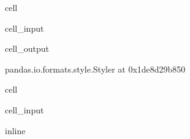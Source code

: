 \documentclass[letterpaper,10pt,english]{jupyterBook}
\begin{document}
\begin{sphinxuseclass}{cell}\begin{sphinxVerbatimInput}

\begin{sphinxuseclass}{cell_input}
\begin{sphinxVerbatim}[commandchars=\\\{\}]
   
\end{sphinxVerbatim}

\end{sphinxuseclass}\end{sphinxVerbatimInput}
\begin{sphinxVerbatimOutput}

\begin{sphinxuseclass}{cell_output}
\begin{sphinxVerbatim}[commandchars=\\\{\}]
\PYGZlt{}pandas.io.formats.style.Styler at 0x1de8d29b850\PYGZgt{}
\end{sphinxVerbatim}

\end{sphinxuseclass}\end{sphinxVerbatimOutput}

\end{sphinxuseclass}
\begin{sphinxuseclass}{cell}\begin{sphinxVerbatimInput}

\begin{sphinxuseclass}{cell_input}
\begin{sphinxVerbatim}[commandchars=\\\{\}]
   
 inline
   
   
   
  
\end{sphinxVerbatim}

\end{sphinxuseclass}\end{sphinxVerbatimInput}

\end{sphinxuseclass}
\end{document}
